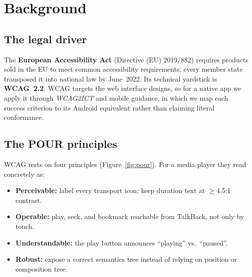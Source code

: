 \section{Background}
\label{sec:bg}

\subsection{The legal driver}
\label{sec:legal}

The \textbf{European Accessibility Act} (Directive (EU) 2019/882) requires products sold in the EU to
meet common accessibility requirements; every member state transposed it into national law by
June~2022. Its technical yardstick is \textbf{WCAG~2.2}. WCAG targets the web interface designs, so for a native app we
apply it through \emph{WCAG2ICT} and mobile guidance, in which we map each success criterion to its
Android equivalent rather than claiming literal conformance.

\subsection{The POUR principles}

WCAG rests on four principles (Figure~\ref{fig:pour}). For a media player they read concretely as:

\begin{itemize}[leftmargin=1.4em,itemsep=1pt]
	\item \textbf{Perceivable:}  label every transport icon; keep duration text at $\geq$4.5:1 contrast.
	\item \textbf{Operable:}  play, seek, and bookmark reachable from TalkBack, not only by touch.
	\item \textbf{Understandable:}  the play button announces ``playing'' vs.\ ``paused''.
	\item \textbf{Robust:}  expose a correct semantics tree instead of relying on position or composition tree.
\end{itemize}


